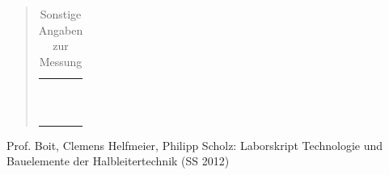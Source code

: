 \begin{quote}
\begin{table}[h]
\begin{addmargin}[-1cm]{3cm}
\begin{tabular}{|p{3cm}|p{3cm}|p{10.2cm}|}
                                 & & \\
                                 & & \\
                                 & & \\
                                 & & \\
                                 & & \\
                                 & & \\
                                 & & \\
                                 & & \\
                                 & & \\
                                 & & \\
                                 & & \\
         \hline
                     \end{tabular}
                  \end{addmargin}
             \caption{Sonstige Angaben zur Messung}
         \label{AngabenZurMessung}
      \end{table}

      \noindent

       \vspace{2em}

\end{quote} %



\begin{thebibliography}{999}




 Prof. Boit, Clemens Helfmeier, Philipp Scholz: Laborskript Technologie und Bauelemente der
Halbleitertechnik (SS 2012)
\end{thebibliography}


